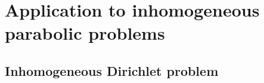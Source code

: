 \documentclass[english,a4paper,10pt,oneside]{scrbook}	%
\theoremstyle{break}
\theoremstyle{remark}
\newcommand{\ds}{\displaystyle}
\newcommand{\norm}[1]{\left\lVert#1\right\rVert}
\newcommand{\HN}[1]{\norm{#1}_{H}}
\newcommand{\VN}[1]{\norm{#1}_{V}}
\newcommand{\VSN}[1]{\norm{#1}_{V^*}}
\newcommand{\emb}{\hookrightarrow}
\begin{document}
%
%
%
%
%
%
%
%
%
%
%
%
%

\section{Application to inhomogeneous parabolic problems}

\subsection{Inhomogeneous Dirichlet problem}
\label{subs:inh_diri}
\end{document}

